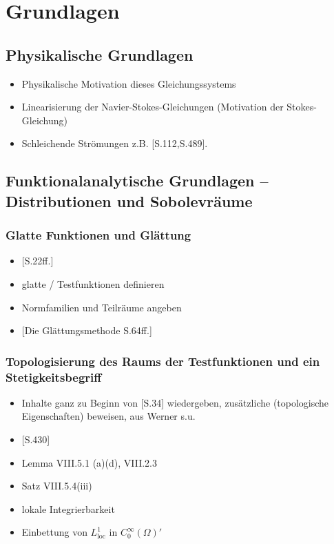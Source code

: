 \chapter{Grundlagen}
\label{cp:grundlagen}

\section{Physikalische Grundlagen}

\begin{itemize}
  \item Physikalische Motivation dieses Gleichungssystems
  \item Linearisierung der Navier-Stokes-Gleichungen (Motivation der Stokes-Gleichung)
  \item Schleichende Strömungen z.B. \cite{spurk10stroemungslehre}[S.112,S.489]. 
\end{itemize}

\section{Funktionalanalytische Grundlagen -- Distributionen und Sobolevräume}

\subsection{Glatte Funktionen und Glättung}

\begin{itemize}
  \item \cite{sohr2001navier}[S.22ff.]
  \item glatte / Testfunktionen definieren
  \item Normfamilien und Teilräume angeben
  \item \cite{sohr2001navier}[Die Glättungsmethode S.64ff.]
\end{itemize}

\subsection{Topologisierung des Raums der Testfunktionen und ein Stetigkeitsbegriff}

\begin{itemize}
  \item Inhalte ganz zu Beginn von \cite{sohr2001navier}[S.34] wiedergeben, zusätzliche (topologische Eigenschaften) beweisen, aus Werner s.u.
  \item \cite{werner2011fa}[S.430]
  \item Lemma VIII.5.1 (a)(d), VIII.2.3
  \item Satz VIII.5.4(iii)
  \item lokale Integrierbarkeit
  \item Einbettung von $L^1_{\mathrm{loc}}$ in $C_0^\infty(\Omega)'$
\end{itemize}

